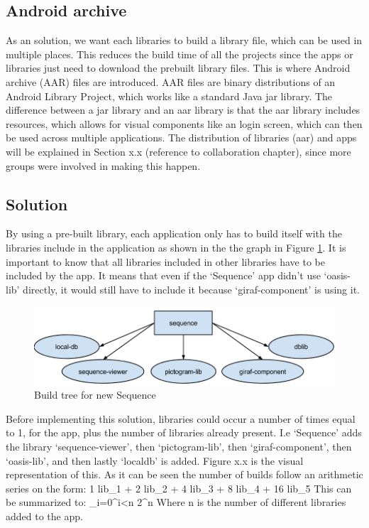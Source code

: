 \subsection{Android archive}
As an solution, we want each libraries to build a library file, which can be used in multiple places. This reduces the build time of all the projects since the apps or libraries just need to download the prebuilt library files.
This is where Android archive (AAR) files are introduced. AAR files are binary distributions of an Android Library Project, which works like a standard Java jar library. The difference between a jar library and an aar library is that the aar library includes resources, which allows for visual components like an login screen, which can then be used across multiple applications. 
The distribution of libraries (aar) and apps will be explained in Section x.x (reference to collaboration chapter), since more groups were involved in making this happen.

\subsection{Solution}
By using a pre-built library, each application only has to build itself with the libraries include in the application as shown in the the graph in Figure \ref{newbuild}. It is important to know that all libraries included in other libraries have to be included by the app. It means that even if the ‘Sequence’ app didn't use ‘oasis-lib’ directly, it would still have to include it because ‘giraf-component’ is using it.

\begin{figure}[H]
	\centering
	\includegraphics[width=0.8 \textwidth]{pictures/newbuild.png}
	\caption{Build tree for new Sequence}
	\label{newbuild}
\end{figure}

Before implementing this solution, libraries could occur a number of times equal to 1, for the app, plus the number of libraries already present. I.e ‘Sequence’ adds the library ‘sequence-viewer’, then ‘pictogram-lib’, then ‘giraf-component’, then ‘oasis-lib’, and then lastly ‘localdb’ is added.  Figure x.x is the visual representation of this. As it can be seen the number of builds follow an arithmetic series on the form:
1 lib_{1} + 2 lib_{2} + 4 lib_{3} + 8 lib_{4} + 16 lib_{5}
This can be summarized to:
\displaystyle\sum_{i=0}^{i<n} 2^n
Where n is the number of different libraries added to the app.

